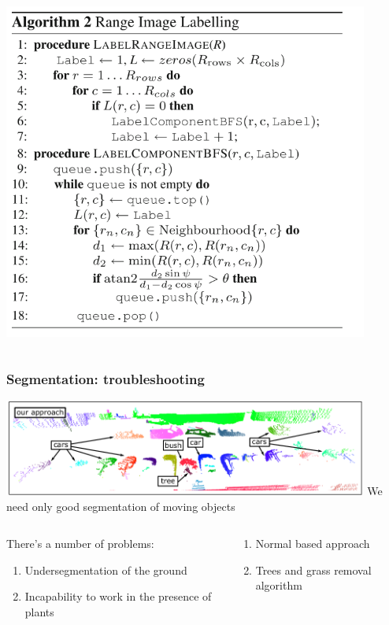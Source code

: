 \documentclass[xcolor=table,usenames,dvipsnames]{beamer}
\begin{document}
\begin{frame}
\begin{columns}
\begin{column}{0.5\textwidth}
\includegraphics[width=0.9\textwidth]{img/segmentation_algo.png}
\end{column}
\end{columns}
\end{frame}
\begin{frame}
\frametitle{Segmentation: troubleshooting}
\includegraphics[width=0.9\textwidth]{img/segmentation_sample.png}
We need only good segmentation of moving objects
\begin{columns}
\begin{column}{0.5\textwidth}
There's a number of problems:
\begin{enumerate}
\item Undersegmentation of the ground
\item Incapability to work in the presence of plants
\end{enumerate}
\end{column}
\begin{column}{0.5\textwidth}
\begin{enumerate}
\item Normal based approach
\item Trees and grass removal algorithm
\end{enumerate}
\end{column}
\end{columns}
\end{frame}
\end{document}
